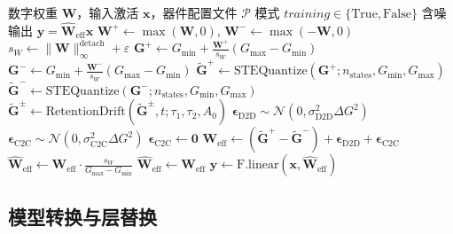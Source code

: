 \begin{algorithm}[t]
\caption{模拟层物理前向传播}
\label{alg:forward-pass}
\begin{algorithmic}[1]
\Require 数字权重 $\mathbf{W}$，输入激活 $\mathbf{x}$，器件配置文件 $\mathcal{P}$
\Require 模式 $\mathit{training} \in \{\text{True}, \text{False}\}$
\Ensure 含噪输出 $\mathbf{y} = \widehat{\mathbf{W}}_{\text{eff}} \mathbf{x}$
\State $\mathbf{W}^{+} \gets \max(\mathbf{W}, 0)$, \quad $\mathbf{W}^{-} \gets \max(-\mathbf{W}, 0)$ 
\State $s_W \gets \lVert \mathbf{W} \rVert_{\infty}^{\text{detach}} + \varepsilon$ 
\State $\mathbf{G}^{+} \gets G_{\min} + \frac{\mathbf{W}^{+}}{s_W}(G_{\max} - G_{\min})$ 
\State $\mathbf{G}^{-} \gets G_{\min} + \frac{\mathbf{W}^{-}}{s_W}(G_{\max} - G_{\min})$
\State $\widetilde{\mathbf{G}}^{+} \gets \text{STEQuantize}(\mathbf{G}^{+}; n_{\text{states}}, G_{\min}, G_{\max})$ 
\State $\widetilde{\mathbf{G}}^{-} \gets \text{STEQuantize}(\mathbf{G}^{-}; n_{\text{states}}, G_{\min}, G_{\max})$
    \State $\widetilde{\mathbf{G}}^{\pm} \gets \text{RetentionDrift}(\widetilde{\mathbf{G}}^{\pm}, t; \tau_1, \tau_2, A_0)$ 
\EndIf
{}
    \State $\boldsymbol{\epsilon}_{\text{D2D}} \sim \mathcal{N}(0, \sigma_{\text{D2D}}^{2} \Delta G^{2})$ 
\EndIf
{}
    \State $\boldsymbol{\epsilon}_{\text{C2C}} \sim \mathcal{N}(0, \sigma_{\text{C2C}}^{2} \Delta G^{2})$ 
\Else
    \State $\boldsymbol{\epsilon}_{\text{C2C}} \gets \mathbf{0}$
\EndIf
\State $\mathbf{W}_{\text{eff}} \gets (\widetilde{\mathbf{G}}^{+} - \widetilde{\mathbf{G}}^{-}) + \boldsymbol{\epsilon}_{\text{D2D}} + \boldsymbol{\epsilon}_{\text{C2C}}$ 
    \State $\widehat{\mathbf{W}}_{\text{eff}} \gets \mathbf{W}_{\text{eff}} \cdot \frac{s_W}{G_{\max} - G_{\min}}$ 
\Else
    \State $\widehat{\mathbf{W}}_{\text{eff}} \gets \mathbf{W}_{\text{eff}}$
\EndIf
\State \Return $\mathbf{y} \gets \text{F.linear}(\mathbf{x}, \widehat{\mathbf{W}}_{\text{eff}})$
\end{algorithmic}
\end{algorithm}

\subsection{模型转换与层替换}

